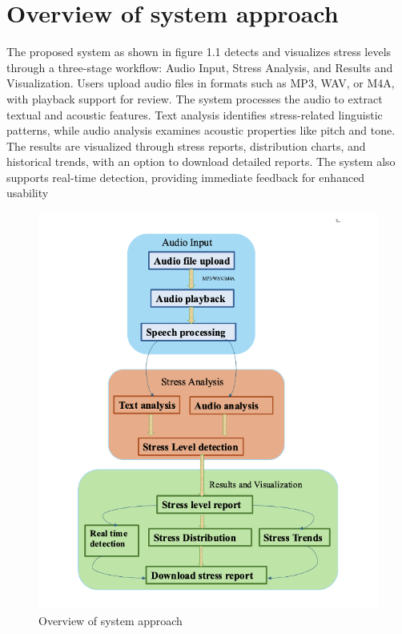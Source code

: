 \documentclass[Arial,12pt,openright,twoside]{book}
\begin{document}
  \section{Overview of system approach}
  The proposed system as shown in figure 1.1 detects and visualizes stress levels through a three-stage workflow: Audio Input, Stress Analysis, and Results and Visualization. Users upload audio files in formats such as MP3, WAV, or M4A, with playback support for review. The system processes the audio to extract textual and acoustic features. Text analysis identifies stress-related linguistic patterns, while audio analysis examines acoustic properties like pitch and tone. The results are visualized through stress reports, distribution charts, and historical trends, with an option to download detailed reports. The system also supports real-time detection, providing immediate feedback for enhanced usability
  \vspace{10pt} %
  \begin{figure}[p]
    \centering
    \includegraphics[width=1.1\columnwidth]{ap1.png}
    \caption{Overview of system approach}
    \label{fig:system_architecture}
\end{figure}
\vspace{10pt} %
\end{document}

